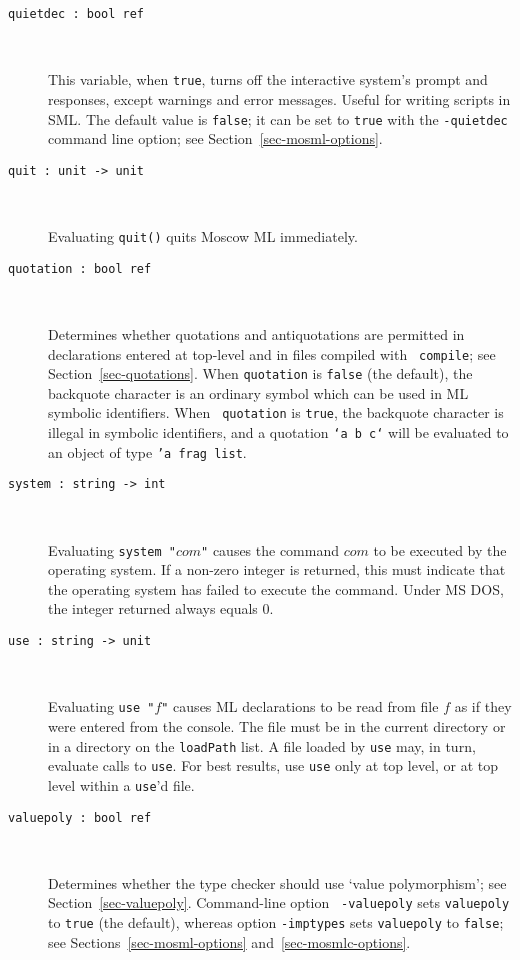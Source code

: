 \documentclass[fleqn]{article}
\begin{document}
\begin{description}
\item[{\tt quietdec :\ bool ref}]\mbox{ }

  This variable, when {\tt true}, turns off the interactive system's
  prompt and responses, except warnings and error messages.  Useful
  for writing scripts in SML\@.  The default value is {\tt false}; it
  can be set to {\tt true} with the {\tt -quietdec} command line
  option; see Section~\ref{sec-mosml-options}.

\item[{\tt quit :\ unit -> unit}]\mbox{ }

  Evaluating {\tt quit()} quits Moscow ML immediately.

\item[{\tt quotation :\ bool ref}]\mbox{ }

  Determines whether quotations and antiquotations are permitted in
  declarations entered at top-level and in files compiled with {\tt
    compile}; see Section~\ref{sec-quotations}.  When {\tt quotation}
  is {\tt false} (the default), the backquote character is an ordinary
  symbol which can be used in ML symbolic identifiers.  When {\tt
    quotation} is {\tt true}, the backquote character is illegal in
  symbolic identifiers, and a quotation {\tt `a b c`} will be
  evaluated to an object of type {\tt 'a frag list}.

\item[{\tt system :\ string -> int}]\mbox{ }

  Evaluating {\tt system "$com$"} causes the command $com$ to be
  executed by the operating system.  If a non-zero integer is
  returned, this must indicate that the operating system has failed to
  execute the command.  Under MS DOS, the integer returned always
  equals 0.

\item[{\tt use :\ string -> unit}]\mbox{ }

  Evaluating {\tt use "$f$"} causes ML declarations to be read from
  file $f$ as if they were entered from the console.  The file must be
  in the current directory or in a directory on the {\tt loadPath}
  list.  A file loaded by {\tt use} may, in turn, evaluate calls to
  {\tt use}.  For best results, use {\tt use} only at top level, or at
  top level within a {\tt use}'d file.

\item[{\tt valuepoly :\ bool ref}]\mbox{ }

  Determines whether the type checker should use `value polymorphism';
  see Section~\ref{sec-valuepoly}.  Command-line option {\tt
    -valuepoly} sets {\tt valuepoly} to {\tt true} (the default),
  whereas option {\tt -imptypes} sets {\tt valuepoly} to {\tt false};
  see Sections~\ref{sec-mosml-options} and~\ref{sec-mosmlc-options}.


\end{description}
\end{document}
